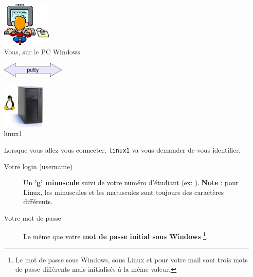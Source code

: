\documentclass[a4paper,11pt]{style-esi/td}
\begin{document}
		\begin{colxbox}[colback=white,halign=center,drop fuzzy shadow]
		\begin{centering}
			\begin{minipage}{10em}
				\centering
				\includegraphics[height=6em]{images/putty1}\\
				{\footnotesize Vous, sur le PC Windows}
			\end{minipage}
			\qquad
			\begin{minipage}{8em}
				\centering
				\includegraphics[height=2em]{images/putty2}
			\end{minipage}
			\qquad
			\begin{minipage}{10em}
				\centering
				\includegraphics[height=6em]{images/putty3}\\
				{\footnotesize linux1}
			\end{minipage}
		\end{centering}
		\end{colxbox}

		\bigskip
		Lorsque vous allez vous connecter, \verb_linux1_ va vous demander de vous identifier.

		\begin{infobox}
			\begin{description}
			\item[Votre login (username)]
				Un \textbf{'g' minuscule} suivi de votre numéro d'étudiant
				(ex: ).
				\textbf{Note} : pour Linux, les minuscules et les majuscules 
				sont toujours des caractères différents.
			\item[Votre mot de passe]
				Le même que votre \textbf{mot de passe initial sous Windows}%
				\footnote{%
					Le mot de passe sous Windows,
					sous Linux et pour votre mail  
					sont trois mots de passe différents
					mais initialisés à la même valeur.        
				}.			
			\end{description}
		\end{infobox}
\end{document}
